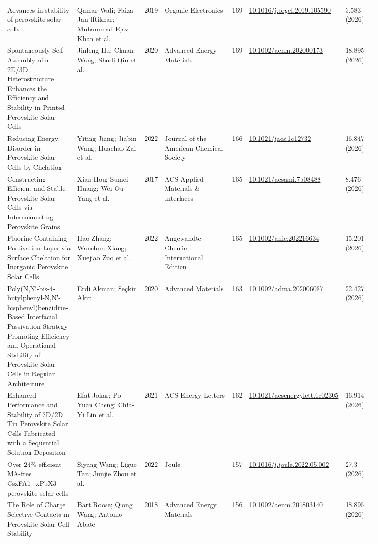 \documentclass[10pt,a4paper]{article}
\begin{document}
{\begin{longtable}{p{0.197\linewidth}p{0.197\linewidth}p{0.043\linewidth}p{0.197\linewidth}p{0.043\linewidth}p{0.117\linewidth}p{0.098\linewidth}}
Advances in stability of perovskite solar cells & Qamar Wali; Faiza Jan Iftikhar; Muhammad Ejaz Khan et al. & 2019 & Organic Electronics & 169 & \href{https://doi.org/10.1016/j.orgel.2019.105590}{10.1016/j.orgel.2019.105590} & 3.583 (2026) \\
Spontaneously Self‐Assembly of a 2D/3D Heterostructure Enhances the Efficiency and Stability in Printed Perovskite Solar Cells & Jinlong Hu; Chuan Wang; Shudi Qiu et al. & 2020 & Advanced Energy Materials & 169 & \href{https://doi.org/10.1002/aenm.202000173}{10.1002/aenm.202000173} & 18.895 (2026) \\
Reducing Energy Disorder in Perovskite Solar Cells by Chelation & Yiting Jiang; Jiabin Wang; Huachao Zai et al. & 2022 & Journal of the American Chemical Society & 166 & \href{https://doi.org/10.1021/jacs.1c12732}{10.1021/jacs.1c12732} & 16.847 (2026) \\
Constructing Efficient and Stable Perovskite Solar Cells via Interconnecting Perovskite Grains & Xian Hou; Sumei Huang; Wei Ou‐Yang et al. & 2017 & ACS Applied Materials \& Interfaces & 165 & \href{https://doi.org/10.1021/acsami.7b08488}{10.1021/acsami.7b08488} & 8.476 (2026) \\
Fluorine‐Containing Passivation Layer via Surface Chelation for Inorganic Perovskite Solar Cells & Hao Zhang; Wanchun Xiang; Xuejiao Zuo et al. & 2022 & Angewandte Chemie International Edition & 165 & \href{https://doi.org/10.1002/anie.202216634}{10.1002/anie.202216634} & 15.201 (2026) \\
Poly(N,N′‐bis‐4‐butylphenyl‐N,N′‐bisphenyl)benzidine‐Based Interfacial Passivation Strategy Promoting Efficiency and Operational Stability of Perovskite Solar Cells in Regular Architecture & Erdi Akman; Seçkin Akın & 2020 & Advanced Materials & 163 & \href{https://doi.org/10.1002/adma.202006087}{10.1002/adma.202006087} & 22.427 (2026) \\
Enhanced Performance and Stability of 3D/2D Tin Perovskite Solar Cells Fabricated with a Sequential Solution Deposition & Efat Jokar; Po‐Yuan Cheng; Chia-Yi Lin et al. & 2021 & ACS Energy Letters & 162 & \href{https://doi.org/10.1021/acsenergylett.0c02305}{10.1021/acsenergylett.0c02305} & 16.914 (2026) \\
Over 24\% efficient MA-free CsxFA1−xPbX3 perovskite solar cells & Siyang Wang; Liguo Tan; Junjie Zhou et al. & 2022 & Joule & 157 & \href{https://doi.org/10.1016/j.joule.2022.05.002}{10.1016/j.joule.2022.05.002} & 27.3 (2026) \\
The Role of Charge Selective Contacts in Perovskite Solar Cell Stability & Bart Roose; Qiong Wang; Antonio Abate & 2018 & Advanced Energy Materials & 156 & \href{https://doi.org/10.1002/aenm.201803140}{10.1002/aenm.201803140} & 18.895 (2026) \\

\end{longtable}}
\end{document}
